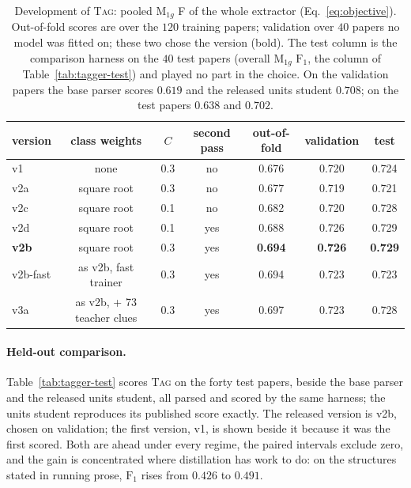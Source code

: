 \documentclass[10pt]{article}
\newcommand{\tagger}{\textsc{Tag}}
\begin{document}
\begin{table}[h]
\centering\small
\caption{Development of \tagger{}: pooled $\mathrm{M}_{1g}$ F of the whole extractor (Eq.~\ref{eq:objective}). Out-of-fold scores are over the $120$ training papers; validation over $40$ papers no model was fitted on; these two chose the version (bold). The test column is the comparison harness on the $40$ test papers (overall $\mathrm{M}_{1g}$ $\mathrm{F}_1$, the column of Table~\ref{tab:tagger-test}) and played no part in the choice. On the validation papers the base parser scores $0.619$ and the released units student $0.708$; on the test papers $0.638$ and $0.702$.}
\label{tab:tagger-dev}
\begin{tabular}{@{}lcccccc@{}}
\toprule
\textbf{version} & \textbf{class weights} & $C$ & \textbf{second pass} & \textbf{out-of-fold} & \textbf{validation} & \textbf{test} \\
\midrule
v1   & none        & 0.3 & no  & 0.676 & 0.720 & 0.724 \\
v2a  & square root & 0.3 & no  & 0.677 & 0.719 & 0.721 \\
v2c  & square root & 0.1 & no  & 0.682 & 0.720 & 0.728 \\
v2d  & square root & 0.1 & yes & 0.688 & 0.726 & 0.729 \\
\textbf{v2b}  & square root & 0.3 & yes & \textbf{0.694} & \textbf{0.726} & \textbf{0.729} \\
v2b-fast  & as v2b, fast trainer & 0.3 & yes & 0.694 & 0.723 & 0.723 \\
v3a  & as v2b, + 73 teacher clues & 0.3 & yes & 0.697 & 0.723 & 0.728 \\
\bottomrule
\end{tabular}
\end{table}

\paragraph{Held-out comparison.}
Table~\ref{tab:tagger-test} scores \tagger{} on the forty test papers, beside the base parser and the released units student, all parsed and scored by the same harness; the units student reproduces its published score exactly. The released version is v2b, chosen on validation; the first version, v1, is shown beside it because it was the first scored. Both are ahead under every regime, the paired intervals exclude zero, and the gain is concentrated where distillation has work to do: on the structures stated in running prose, $\mathrm{F}_1$ rises from $0.426$ to $0.491$.
\end{document}
